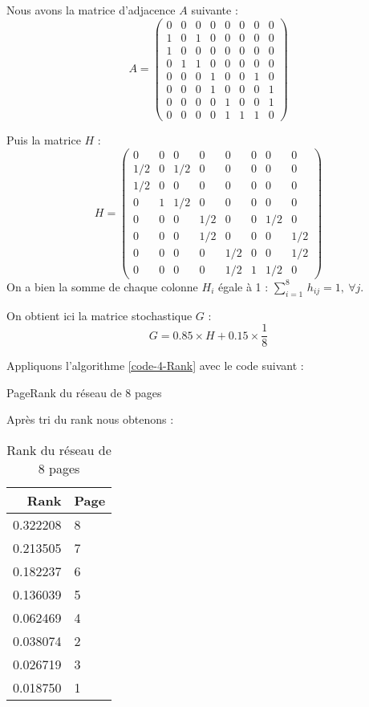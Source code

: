 			Nous avons la matrice d'adjacence $A$ suivante :
			$$
				A = \begin{pmatrix}
					0 & 0 & 0 & 0 & 0 & 0 & 0 & 0 \\
					1 & 0 & 1 & 0 & 0 & 0 & 0 & 0 \\
					1 & 0 & 0 & 0 & 0 & 0 & 0 & 0 \\
					0 & 1 & 1 & 0 & 0 & 0 & 0 & 0 \\
					0 & 0 & 0 & 1 & 0 & 0 & 1 & 0 \\
					0 & 0 & 0 & 1 & 0 & 0 & 0 & 1 \\
					0 & 0 & 0 & 0 & 1 & 0 & 0 & 1 \\
					0 & 0 & 0 & 0 & 1 & 1 & 1 & 0
				\end{pmatrix}
			$$

			Puis la matrice $H$ :
			$$
				H = \begin{pmatrix}
					0 		& 0 		& 0 		& 0 		& 0 		& 0 		& 0 		& 0 	\\
					1/2		& 0 		& 1/2 		& 0 		& 0 		& 0 		& 0 		& 0 	\\
					1/2		& 0 		& 0 		& 0 		& 0 		& 0 		& 0 		& 0 	\\
					0 		& 1 		& 1/2 		& 0 		& 0 		& 0 		& 0 		& 0 	\\
					0 		& 0 		& 0 		& 1/2 		& 0 		& 0 		& 1/2		& 0 	\\
					0 		& 0 		& 0 		& 1/2 		& 0 		& 0 		& 0 		& 1/2 	\\
					0 		& 0 		& 0 		& 0 		& 1/2 		& 0 		& 0 		& 1/2 	\\
					0 		& 0 		& 0 		& 0 		& 1/2 		& 1 		& 1/2 		& 0
				\end{pmatrix}
			$$
			On a bien la somme de chaque colonne $H_i$ égale à 1 : $\sum_{i=1}^8 \, h_{ij} = 1, ~ \forall j$.

			On obtient ici la matrice stochastique $G$ :
			$$
				G = 0.85 \times H + 0.15\times \frac{1}{8}
			$$
			
			Appliquons l'algorithme \ref{code-4-Rank} avec le code suivant :

			\begin{listing}[H]
				\caption{PageRank du réseau de 8 pages}
				\label{code-4-PageRank8}
			\end{listing}

			Après tri du rank nous obtenons :
			\begin{table}[H]
				\centering
				\begin{tabular}{|r|l|}
					\hline
					Rank		& Page	\\	\hline
					\hline
					0.322208	& 8		\\	\hline
					0.213505	& 7		\\	\hline
					0.182237	& 6		\\	\hline
					0.136039	& 5		\\	\hline
					0.062469	& 4		\\	\hline
					0.038074	& 2		\\	\hline
					0.026719	& 3		\\	\hline
					0.018750	& 1		\\	\hline
				\end{tabular}
				\caption{Rank du réseau de 8 pages}
				\label{tb-4-rank8}
			\end{table}

